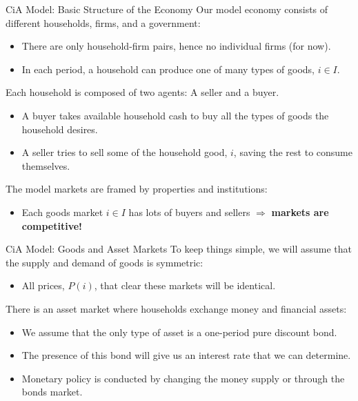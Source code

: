 \documentclass[10pt,c,aspectratio=1610,handout]{beamer}
\begin{document}
\begin{frame}{CiA Model: Basic Structure of the Economy}%
  Our model economy consists of different households, firms, and a government:%
  \begin{itemize}%
    \item[$\blacktriangleright$] There are only household-firm pairs, hence no individual firms (for now).%
    \item[$\blacktriangleright$] In each period, a household can produce one of many types of goods, $i \in I$.%
  \end{itemize}%
  \vspace*{0.1in}%
  \pause%
  Each household is composed of two agents: A seller and a buyer.%
  \begin{itemize}
    \item[$\blacktriangleright$] A buyer takes available household cash to buy all the types of goods the household desires.%
    \item[$\blacktriangleright$] A seller tries to sell some of the household good, $i$, saving the rest to consume themselves.%
  \end{itemize}%
  \vspace*{0.1in}%
  \pause%
  The model markets are framed by properties and institutions:%
  \begin{itemize}%
    \item[$\blacktriangleright$] Each goods market $i \in I$ has lots of buyers and sellers $\Rightarrow$ \textbf{markets are competitive!}%
  \end{itemize}%
\end{frame}%
\begin{frame}{CiA Model: Goods and Asset Markets}%
  To keep things simple, we will assume that the supply and demand of goods is symmetric:%
  \begin{itemize}%
    \item[$\blacktriangleright$] All prices, $P(i)$, that clear these markets will be identical.%
  \end{itemize}%
  \bigskip%
  \pause%
  There is an asset market where households exchange money and financial assets:%
  \begin{itemize}%
    \item[$\blacktriangleright$] We assume that the only type of asset is a one-period pure discount bond.%
    \item[$\blacktriangleright$] The presence of this bond will give us an interest rate that we can determine.%
    \item[$\blacktriangleright$] Monetary policy is conducted by changing the money supply or through the bonds market.%
  \end{itemize}%
\end{frame}%
\end{document}
